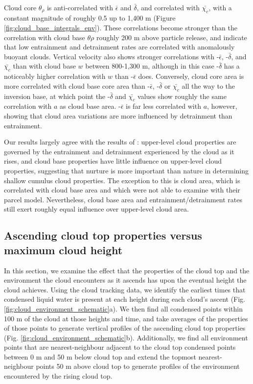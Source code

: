 \documentclass[acp]{copernicus}
\begin{document}
Cloud core $\theta_\rho$ is anti-correlated with $\bar{\epsilon}$ and 
$\bar{\delta}$, and correlated with $\bar{\chi_c}$, with a constant 
magnitude of roughly 0.5 up to 1,400 m (Figure 
\ref{fig:cloud_base_integrals_env}). These correlations become stronger than 
the correlation with cloud base $\theta\rho$ roughly 200 m above particle 
release, and indicate that low entrainment and detrainment rates are correlated 
with anomalously buoyant clouds.  Vertical velocity also shows stronger 
correlations with -$\bar{\epsilon}$, -$\bar{\delta}$, and $\bar{\chi_c}$ 
than with cloud base $w$ between 800-1,300 m, although in this case 
-$\bar{\delta}$ has a noticeably higher correlation with $w$ than 
-$\bar{\epsilon}$ does.  Conversely, cloud core area is more correlated with 
cloud base core area than -$\bar{\epsilon}$, -$\bar{\delta}$ or 
$\bar{\chi_c}$ all the way to the inversion base, at which point the 
-$\bar{\delta}$ and $\bar{\chi_c}$ values show roughly the same correlation 
with $a$ as cloud base area.  -$\bar{\epsilon}$ is far less 
correlated with $a$, however, showing that cloud area variations are more 
influenced by detrainment than entrainment.

Our results largely agree with the results of \cite{Romps2010a}: upper-level 
cloud properties are governed by the entrainment and detrainment experienced by 
the cloud as it rises, and cloud base properties have little influence on 
upper-level cloud properties, suggesting that nurture is more important than 
nature in determining shallow cumulus cloud properties.  The exception to this
is cloud area, which is correlated with cloud base area and which
\citeauthor{Romps2010a} were not able to examine with their parcel model.
Nevertheless, cloud base area and entrainment/detrainment rates still exert 
roughly equal influence over upper-level cloud area.

\subsection{Ascending cloud top properties versus maximum cloud height}

In this section, we examine the effect that the properties of the cloud top and 
the environment the cloud encounters as it ascends has upon the eventual height 
the cloud achieves.  Using the cloud tracking data, we identify the earliest 
times that condensed liquid water is present at each height during each cloud's 
ascent (Fig. \ref{fig:cloud_environment_schematic}a).  We then find all 
condensed points within 100 m of the cloud at those heights and time, and take 
averages of the properties of those points to generate vertical profiles of the 
ascending cloud top properties (Fig. \ref{fig:cloud_environment_schematic}b).  
Additionally, we find all environment points that are nearest-neighbour 
adjacent to the cloud top condensed points between 0 m and 50 m below cloud top 
and extend the topmost nearest-neighbour points 50 m above cloud top to 
generate profiles of the environment encountered by the rising cloud top.
\end{document}
